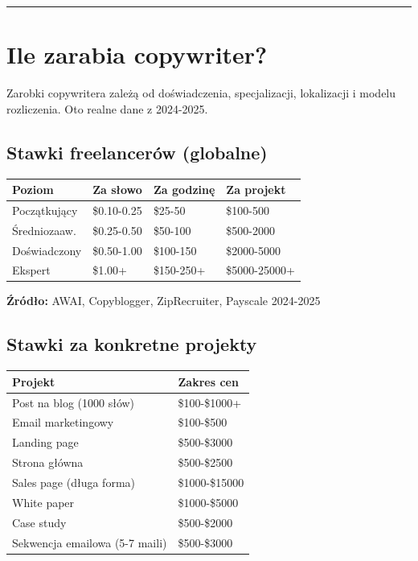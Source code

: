 \documentclass[
  12pt,
  a4paper,
  twoside,
  openright,
  12pt,
  DIV=12,
  BCOR=12mm]{scrbook}
\newcommand{\decoline}{%
  \begin{center}
    \textcolor{bordergray}{\rule{0.3\textwidth}{0.5pt}}
  \end{center}
}
\begin{document}
\decoline

\section{Ile zarabia copywriter?}\label{ile-zarabia-copywriter}

Zarobki copywritera zależą od doświadczenia, specjalizacji, lokalizacji
i modelu rozliczenia. Oto realne dane z 2024-2025.

\subsection{Stawki freelancerów
(globalne)}\label{stawki-freelanceruxf3w-globalne}

\begin{longtable}[]{@{}llll@{}}
\toprule\noalign{}
Poziom & Za słowo & Za godzinę & Za projekt \\
\midrule\noalign{}
\endhead
\bottomrule\noalign{}
\endlastfoot
Początkujący & \$0.10-0.25 & \$25-50 & \$100-500 \\
Średniozaaw. & \$0.25-0.50 & \$50-100 & \$500-2000 \\
Doświadczony & \$0.50-1.00 & \$100-150 & \$2000-5000 \\
Ekspert & \$1.00+ & \$150-250+ & \$5000-25000+ \\
\end{longtable}

\textbf{Źródło:} AWAI, Copyblogger, ZipRecruiter, Payscale 2024-2025

\subsection{Stawki za konkretne
projekty}\label{stawki-za-konkretne-projekty}

\begin{longtable}[]{@{}ll@{}}
\toprule\noalign{}
Projekt & Zakres cen \\
\midrule\noalign{}
\endhead
\bottomrule\noalign{}
\endlastfoot
Post na blog (1000 słów) & \$100-\$1000+ \\
Email marketingowy & \$100-\$500 \\
Landing page & \$500-\$3000 \\
Strona główna & \$500-\$2500 \\
Sales page (długa forma) & \$1000-\$15000 \\
White paper & \$1000-\$5000 \\
Case study & \$500-\$2000 \\
Sekwencja emailowa (5-7 maili) & \$500-\$3000 \\
\end{longtable}
\end{document}

